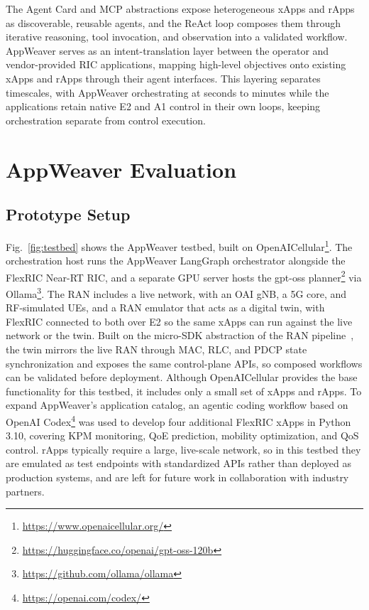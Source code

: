 \documentclass[conference]{IEEEtran}
\begin{document}
The Agent Card and MCP abstractions expose heterogeneous xApps and rApps as discoverable, reusable agents, and the ReAct loop composes them through iterative reasoning, tool invocation, and observation into a validated workflow. AppWeaver serves as an intent-translation layer between the operator and vendor-provided RIC applications, mapping high-level objectives onto existing xApps and rApps through their agent interfaces. This layering separates timescales, with AppWeaver orchestrating at seconds to minutes while the applications retain native E2 and A1 control in their own loops, keeping orchestration separate from control execution.


\section{AppWeaver Evaluation}\label{sec:evaluation}
\subsection{Prototype Setup}
Fig.~\ref{fig:testbed} shows the AppWeaver testbed, built on OpenAICellular\footnote{\url{https://www.openaicellular.org/}}. The orchestration host runs the AppWeaver LangGraph orchestrator alongside the FlexRIC Near-RT RIC, and a separate GPU server hosts the gpt-oss planner\footnote{\url{https://huggingface.co/openai/gpt-oss-120b}} via Ollama\footnote{\url{https://github.com/ollama/ollama}}. The RAN includes a live network, with an OAI gNB, a 5G core, and RF-simulated UEs, and a RAN emulator that acts as a digital twin, with FlexRIC connected to both over E2 so the same xApps can run against the live network or the twin. Built on the micro-SDK abstraction of the RAN pipeline~\cite{schmidt2021ran}, the twin mirrors the live RAN through MAC, RLC, and PDCP state synchronization and exposes the same control-plane APIs, so composed workflows can be validated before deployment. Although OpenAICellular provides the base functionality for this testbed, it includes only a small set of xApps and rApps. To expand AppWeaver's application catalog, an agentic coding workflow based on OpenAI Codex\footnote{\url{https://openai.com/codex/}} was used to develop four additional FlexRIC xApps in Python 3.10, covering KPM monitoring, QoE prediction, mobility optimization, and QoS control. rApps typically require a large, live-scale network, so in this testbed they are emulated as test endpoints with standardized APIs rather than deployed as production systems, and are left for future work in collaboration with industry partners.
\end{document}
